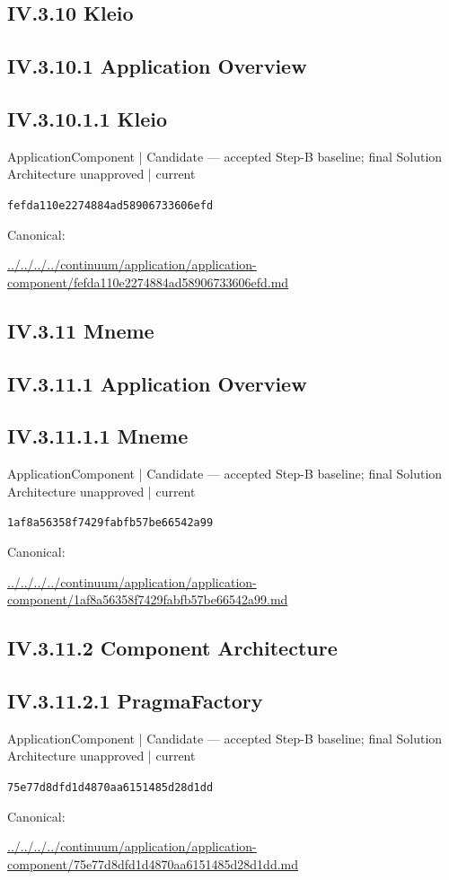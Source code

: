 \documentclass[10pt,a4paper]{article}
\begin{document}
\subsection*{IV.3.10 Kleio}
\subsection*{IV.3.10.1 Application Overview}
\subsection*{IV.3.10.1.1 Kleio}
{\small ApplicationComponent | Candidate — accepted Step-B baseline; final Solution Architecture unapproved | current}\par
\texttt{fefda110e2274884ad58906733606efd}\par
Canonical: \par
{\footnotesize\url{../../../../continuum/application/application-component/fefda110e2274884ad58906733606efd.md}}\par
\subsection*{IV.3.11 Mneme}
\subsection*{IV.3.11.1 Application Overview}
\subsection*{IV.3.11.1.1 Mneme}
{\small ApplicationComponent | Candidate — accepted Step-B baseline; final Solution Architecture unapproved | current}\par
\texttt{1af8a56358f7429fabfb57be66542a99}\par
Canonical: \par
{\footnotesize\url{../../../../continuum/application/application-component/1af8a56358f7429fabfb57be66542a99.md}}\par
\subsection*{IV.3.11.2 Component Architecture}
\subsection*{IV.3.11.2.1 PragmaFactory}
{\small ApplicationComponent | Candidate — accepted Step-B baseline; final Solution Architecture unapproved | current}\par
\texttt{75e77d8dfd1d4870aa6151485d28d1dd}\par
Canonical: \par
{\footnotesize\url{../../../../continuum/application/application-component/75e77d8dfd1d4870aa6151485d28d1dd.md}}\par
\end{document}
